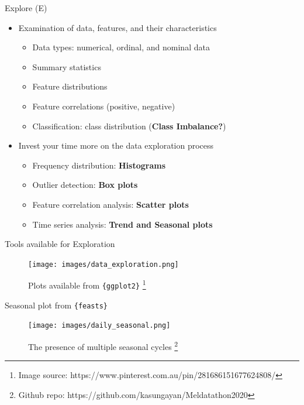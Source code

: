 \documentclass[12pt,ignorenonframetext,]{beamer}
\providecommand{\tightlist}{%
  \setlength{\itemsep}{0pt}\setlength{\parskip}{0pt}}
\begin{document}
\begin{frame}{Explore (E)}
\protect\hypertarget{explore-e}{}

\begin{itemize}
\tightlist
\item
  Examination of data, features, and their characteristics \vspace{2mm}

  \begin{itemize}
      \item Data types: numerical, ordinal, and nominal data
      \item Summary statistics
      \item Feature distributions
      \item Feature correlations (positive, negative)
      \item Classification: class distribution (\textbf{Class Imbalance?})
  \end{itemize}
   \vspace{2mm}
\item
  Invest your time more on the data exploration process

  \begin{itemize}
      \item Frequency distribution: \textbf{Histograms}
      \item Outlier detection: \textbf{Box plots}
      \item Feature correlation analysis: \textbf{Scatter plots}
      \item Time series analysis: \textbf{Trend and Seasonal plots}
  \end{itemize}
\end{itemize}

\end{frame}

\begin{frame}{Tools available for Exploration}
\protect\hypertarget{tools-available-for-exploration}{}

\begin{figure}
  \texttt{[image: images/data\_exploration.png]}
  \caption{Plots available from \texttt{\{ggplot2\}}%
    \footnote{%
     \tiny{Image source: https://www.pinterest.com.au/pin/281686151677624808/}
    }%
  }
\end{figure}

\end{frame}

\begin{frame}{Seasonal plot from \texttt{\{feasts\}}}
\protect\hypertarget{seasonal-plot-from}{}

\begin{figure}
  \texttt{[image: images/daily\_seasonal.png]}
  \caption{The presence of multiple seasonal cycles%
    \footnote{%
     \tiny{Github repo: https://github.com/kasungayan/Meldatathon2020} 
    }%
  }
\end{figure}

\end{frame}
\end{document}
